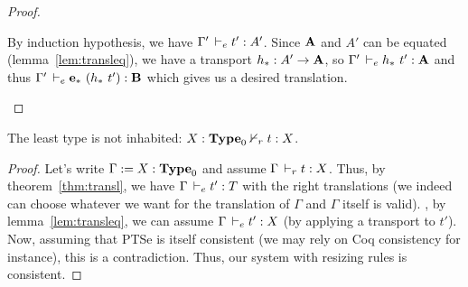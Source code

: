 \documentclass[a4paper,english]{lipics-utf8x}
\begin{document}
\begin{proof}
\begin{caselist}
      \nextcase
      \begin{mathc}
      \end{mathc}
      By induction hypothesis, we have $\Gamma' \,\vdash_e t' : A'$.
      Since $\operatorname{\mathbf{A}}$ and $A'$ can be equated (lemma~\ref{lem:transleq}),
      we have a transport $h_* : A' \to \operatorname{\mathbf{A}}$, so
      $\Gamma' \,\vdash_e h_*\ t' : \operatorname{\mathbf{A}}$ and thus
      $\Gamma' \,\vdash_e \operatorname{\mathbf{e}}_*\ (h_*\ t') : \operatorname{\mathbf{B}}$ which gives us a desired
      translation.
    \end{caselist}
  \end{proof}

  \begin{corollary}[Consistency]
    The least type is not inhabited: $X : \operatorname{\mathbf{Type}}_0 \nvdash_r t : X$.
  \end{corollary}

  \begin{proof}
    Let's write $\Gamma := X : \operatorname{\mathbf{Type}}_0$ and assume $\Gamma \,\vdash_r t : X$.
    Thus, by theorem~\ref{thm:transl}, we have $\Gamma \,\vdash_e t' : T$ with
    the right translations (we indeed can choose whatever we want for the
    translation of $\Gamma$ and $\Gamma$ itself is valid).
    \Wlog, by lemma~\ref{lem:transleq}, we can assume
    $\Gamma \,\vdash_e t' : X$ (by applying a transport to $t'$).
    Now, assuming that PTSe is itself consistent (we may rely on Coq consistency
    for instance), this is a contradiction.
    Thus, our system with resizing rules is consistent.
  \end{proof}
\end{document}
